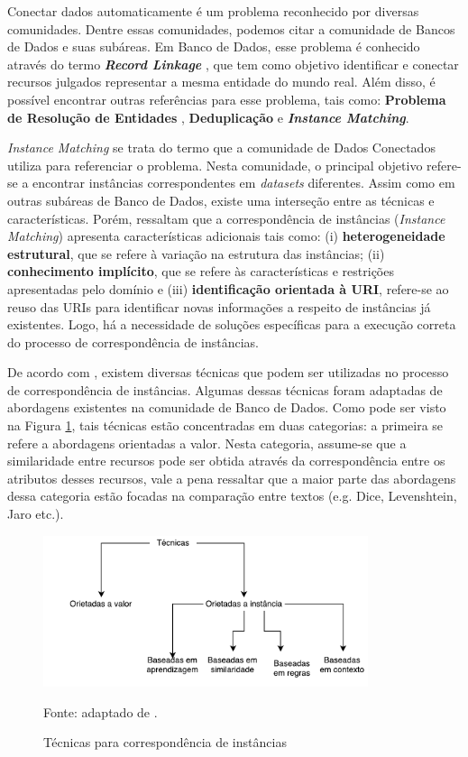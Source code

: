 Conectar dados automaticamente é um problema reconhecido por diversas comunidades. Dentre essas comunidades, podemos citar a comunidade de Bancos de Dados e suas subáreas. Em Banco de Dados, esse problema é conhecido através do termo \textbf{\textit{Record Linkage}} \cite{gu2003record}, que tem como objetivo identificar e conectar recursos julgados representar a mesma entidade do mundo real.  Além disso, é possível encontrar outras referências para esse problema, tais como: \textbf{Problema de Resolução de Entidades} \cite{menestrina2005generic},  \textbf{Deduplicação} \cite{sarawagi2002interactive} e \textbf{\textit{Instance Matching}}.

\textit{Instance Matching} se trata do termo que a  comunidade de Dados Conectados utiliza para referenciar o problema. Nesta comunidade, o principal objetivo refere-se a encontrar instâncias correspondentes em \textit{datasets} diferentes. Assim como em outras subáreas de Banco de Dados, existe uma interseção entre as técnicas e características. Porém,  ressaltam que a correspondência de instâncias (\textit{Instance Matching}) apresenta características adicionais tais como: (i) \textbf{heterogeneidade estrutural}, que se refere à variação na estrutura das instâncias; (ii)\textbf{ conhecimento implícito}, que se refere às características e restrições  apresentadas pelo domínio e (iii) \textbf{identificação orientada à URI}, refere-se ao reuso das URIs para identificar novas informações a respeito de instâncias já existentes. Logo, há a necessidade de soluções específicas para a execução correta do processo de correspondência de instâncias. 

De acordo com \cite{castano2011ontology}, existem diversas técnicas que podem ser utilizadas no processo de correspondência de instâncias. Algumas dessas técnicas foram adaptadas de abordagens existentes na comunidade de Banco de Dados. Como pode ser visto na Figura \ref{fig:im_techniques}, tais técnicas estão concentradas em duas categorias: a primeira se refere a abordagens orientadas a valor. Nesta categoria, assume-se que a similaridade entre recursos pode ser obtida através da correspondência entre os atributos desses recursos, vale a pena ressaltar que a maior parte das abordagens dessa categoria estão focadas na comparação entre textos (e.g. Dice, Levenshtein, Jaro etc.).

\begin{figure}[!h]
	\centering
	\includegraphics[width=0.85\textwidth]{./imagens/im_techniques.pdf}
	\caption{Técnicas para correspondência de instâncias}
	\footnotesize{Fonte: adaptado de \cite{castano2011ontology}.}
	\label{fig:im_techniques}
\end{figure}

